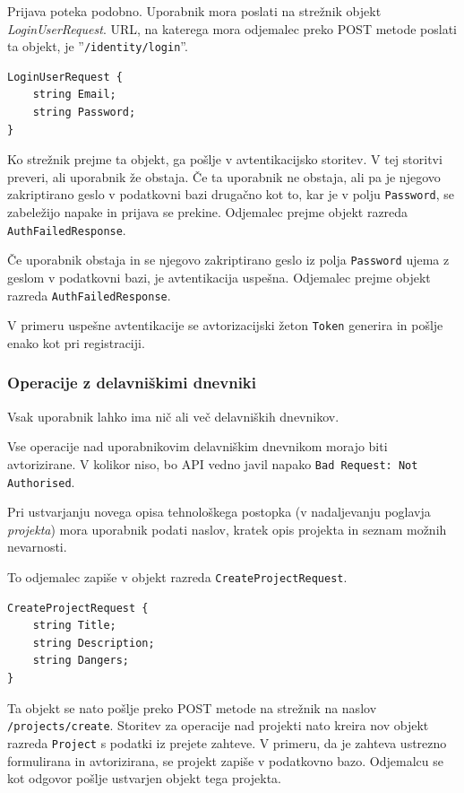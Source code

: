 \documentclass[a4paper, 12pt]{book}
\begin{document}
Prijava poteka podobno.
Uporabnik mora poslati na strežnik objekt \textit{LoginUserRequest}.
URL, na katerega mora odjemalec preko POST metode poslati ta objekt, je ''\texttt{/identity/login}''.

\begin{verbatim}
LoginUserRequest {
    string Email; 
    string Password; 
} 
\end{verbatim}

Ko strežnik prejme ta objekt, ga pošlje v avtentikacijsko storitev.
V tej storitvi preveri, ali uporabnik že obstaja.
Če ta uporabnik ne obstaja, ali pa je njegovo zakriptirano geslo v podatkovni bazi drugačno kot to, kar je v polju \texttt{Password}, se zabeležijo napake in prijava se prekine.
Odjemalec prejme objekt razreda \texttt{AuthFailedResponse}.

Če uporabnik obstaja in se njegovo zakriptirano geslo iz polja \texttt{Password} ujema z geslom v podatkovni bazi, je avtentikacija uspešna.
Odjemalec prejme objekt razreda \texttt{AuthFailedResponse}.

V primeru uspešne avtentikacije se avtorizacijski žeton \texttt{Token} generira in pošlje enako kot pri registraciji.

\subsubsection{Operacije z delavniškimi dnevniki}

Vsak uporabnik lahko ima nič ali več delavniških dnevnikov.

Vse operacije nad uporabnikovim delavniškim dnevnikom morajo biti avtorizirane.
V kolikor niso, bo API vedno javil napako \texttt{Bad Request: Not Authorised}.

Pri ustvarjanju novega opisa tehnološkega postopka (v nadaljevanju poglavja \textit{projekta}) mora uporabnik podati naslov, kratek opis projekta in seznam možnih nevarnosti.

To odjemalec zapiše v objekt razreda \texttt{CreateProjectRequest}.

\begin{verbatim}
CreateProjectRequest { 
    string Title;  
    string Description; 
    string Dangers; 
} 
\end{verbatim}

\noindent Ta objekt se nato pošlje preko POST metode na strežnik na naslov \texttt{/projects/create}.
Storitev za operacije nad projekti nato kreira nov objekt razreda \texttt{Project} s podatki iz prejete zahteve.
V primeru, da je zahteva ustrezno formulirana in avtorizirana, se projekt zapiše v podatkovno bazo.
Odjemalcu se kot odgovor pošlje ustvarjen objekt tega projekta.
\end{document}
